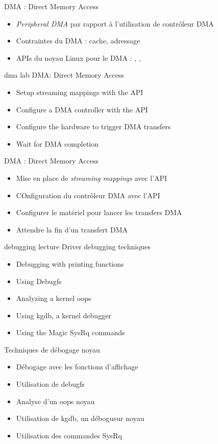 {DMA : Direct Memory Access}
{
  \begin{itemize}
  \item {\em Peripheral DMA} par rapport à l'utilisation de contrôleur DMA
  \item Contraintes du DMA : cache, adressage
  \item APIs du noyau Linux pour le DMA : , , 
  \end{itemize}
}
{dma}
{lab}
{DMA: Direct Memory Access}
{
  \begin{itemize}
  \item Setup streaming mappings with the  API
  \item Configure a DMA controller with the  API
  \item Configure the hardware to trigger DMA transfers
  \item Wait for DMA completion
  \end{itemize}
}
{DMA : Direct Memory Access}
{
  \begin{itemize}
  \item Mise en place de {\em streaming mappings} avec l'API 
  \item COnfiguration du contrôleur DMA avec l'API 
  \item Configurer le matériel pour lancer les transfers DMA
  \item Attendre la fin d'un transfert DMA
  \end{itemize}
}
{debugging}
{lecture}
{Driver debugging techniques}
{
  \begin{itemize}
  \item Debugging with printing functions
  \item Using Debugfs
  \item Analyzing a kernel oops
  \item Using kgdb, a kernel debugger
  \item Using the Magic SysRq commands
  \end{itemize}
}
{Techniques de débogage noyau}
{
  \begin{itemize}
  \item Débogage avec les fonctions d'affichage
  \item Utilisation de debugfs
  \item Analyse d'un oops noyau
  \item Utilisation de kgdb, un débogueur noyau
  \item Utilisation des commandes SysRq
  \end{itemize}
}
